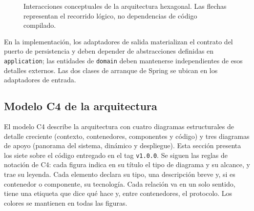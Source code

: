 \documentclass[11pt,a4paper]{article}
\begin{document}
\begin{figure}[H]
\centering
{}
\caption{Interacciones conceptuales de la arquitectura hexagonal. Las flechas representan el recorrido lógico, no dependencias de código compilado.}
\end{figure}

En la implementación, los adaptadores de salida materializan el contrato del
puerto de persistencia y deben depender de abstracciones definidas en
\texttt{application}; las entidades de \texttt{domain} deben mantenerse
independientes de esos detalles externos. Las dos clases de arranque de
Spring se ubican en los adaptadores de entrada.

\subsection{Modelo C4 de la arquitectura}
El modelo C4 describe la arquitectura con cuatro diagramas estructurales de detalle
creciente (contexto, contenedores, componentes y código) y tres diagramas de apoyo
(panorama del sistema, dinámico y despliegue). Esta sección presenta los siete sobre el
código entregado en el tag \texttt{v1.0.0}. Se siguen las reglas de notación de C4: cada
figura indica en su título el tipo de diagrama y su alcance, y trae su leyenda. Cada
elemento declara su tipo, una descripción breve y, si es contenedor o componente, su
tecnología. Cada relación va en un solo sentido, tiene una etiqueta que dice qué hace y,
entre contenedores, el protocolo. Los colores se mantienen en todas las figuras.
\end{document}
